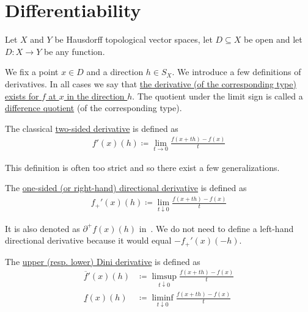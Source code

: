 \section{Differentiability}\label{sec:differentiability}

Let $X$ and $Y$ be Hausdorff topological vector spaces, let $D \subseteq X$ be open and let $D: X \to Y$ be any function.

\begin{definition}\label{def:derivatives}
  We fix a point $x \in D$ and a direction $h \in S_X$. We introduce a few definitions of derivatives. In all cases we say that \uline{the derivative (of the corresponding type) exists for $f$ at $x$ in the direction $h$}. The quotient under the limit sign is called a \uline{difference quotient} (of the corresponding type).

  \begin{defenum}
    \item\label{def:derivatives/classical} The classical \uline{two-sided derivative} is defined as
    \begin{align*}
      f'(x)(h) \coloneqq \lim_{t \to 0} \frac {f(x + th) - f(x)} t
    \end{align*}

    This definition is often too strict and so there exist a few generalizations.

    \item\label{def:derivatives/onesided}\cite[lemma 1.2]{Phelps1993} The \uline{one-sided (or right-hand) directional derivative} is defined as
    \begin{align*}
      f_+'(x)(h) \coloneqq \lim_{t \downarrow 0} \frac {f(x + th) - f(x)} t
    \end{align*}

    It is also denoted as $\partial^+ f(x)(h)$ in~\cite[lemma 1.2]{Phelps1993}. We do not need to define a left-hand directional derivative because it would equal $-f_+'(x)(-h)$.

    \item\label{def:derivatives/dini}\cite[definition 11.18]{Clarke2013} The \uline{upper (resp. lower) Dini derivative} is defined as
    \begin{align*}
      \overline f'(x)(h) &\coloneqq \limsup_{t \downarrow 0} \frac {f(x + th) - f(x)} t
      \\
      \underline f(x)(h) &\coloneqq \liminf_{t \downarrow 0} \frac {f(x + th) - f(x)} t
    \end{align*}


\end{defenum}
\end{definition}
